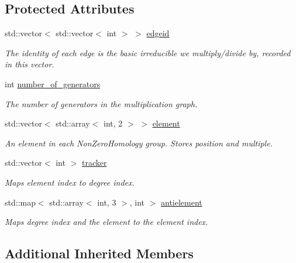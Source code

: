 \subsection*{Protected Attributes}
\begin{DoxyCompactItemize}
\item 
std\+::vector$<$ std\+::vector$<$ int $>$ $>$ \hyperlink{classMackey_1_1MultiplicationGraph_aa0eb04947f664262233ed4cdf650371b}{edgeid}
\begin{DoxyCompactList}\small\item\em The identity of each edge is the basic irreducible we multiply/divide by, recorded in this vector. \end{DoxyCompactList}\item 
int \hyperlink{classMackey_1_1MultiplicationGraph_a9fd088a706e8c2ffeae3db1584de9266}{number\+\_\+of\+\_\+generators}
\begin{DoxyCompactList}\small\item\em The number of generators in the multiplication graph. \end{DoxyCompactList}\item 
std\+::vector$<$ std\+::array$<$ int, 2 $>$ $>$ \hyperlink{classMackey_1_1MultiplicationGraph_af2d7e83708b67fd4367b20755f2185e8}{element}
\begin{DoxyCompactList}\small\item\em An element in each Non\+Zero\+Homology group. Stores position and multiple. \end{DoxyCompactList}\item 
std\+::vector$<$ int $>$ \hyperlink{classMackey_1_1MultiplicationGraph_ac831b81d1936c4dd2202dabaa8e4e2fb}{tracker}
\begin{DoxyCompactList}\small\item\em Maps element index to degree index. \end{DoxyCompactList}\item 
std\+::map$<$ std\+::array$<$ int, 3 $>$, int $>$ \hyperlink{classMackey_1_1MultiplicationGraph_ad0736e72169b51d410d5b61b0f921241}{antielement}
\begin{DoxyCompactList}\small\item\em Maps degree index and the element to the element index. \end{DoxyCompactList}\end{DoxyCompactItemize}
\subsection*{Additional Inherited Members}


